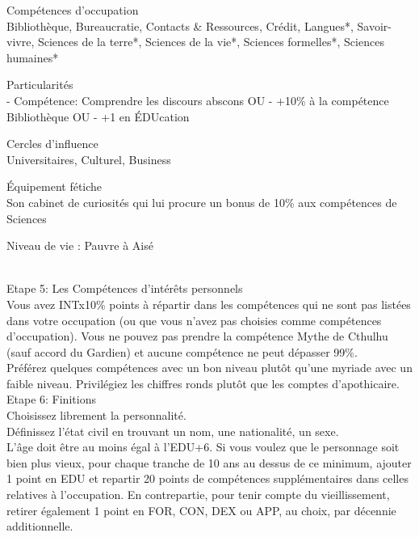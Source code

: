 \documentclass[11pt,twoside,a4paper]{article}
\begin{document}
\begin{multicols*}{2}
\begin{itemize}
	Comp{\'e}tences d'occupation~\\
	Biblioth{\`e}que, Bureaucratie, Contacts \& Ressources, Cr{\'e}dit, Langues*, Savoir-vivre, Sciences de la terre*, Sciences de la vie*, Sciences formelles*, Sciences humaines*
	
	Particularit{\'e}s~\\
	- Comp{\'e}tence: Comprendre les discours abscons OU
	- +10\% {\`a} la comp{\'e}tence Biblioth{\`e}que OU
	- +1 en {\'E}DUcation
	
	Cercles d'influence~\\
	Universitaires, Culturel, Business
	
	{\'E}quipement f{\'e}tiche~\\
	Son cabinet de curiosit{\'e}s qui lui procure un bonus de 10\% aux comp{\'e}tences de Sciences
	
	Niveau de vie : 
	Pauvre {\`a} Ais{\'e}

\end{itemize} ~\\ %

Etape 5: Les Comp{\'e}tences d'int{\'e}r{\^e}ts personnels~\\
	Vous avez INTx10\% points {\`a} r{\'e}partir dans les comp{\'e}tences qui ne sont pas list{\'e}es dans votre occupation (ou que vous n'avez pas choisies comme comp{\'e}tences d'occupation). Vous ne pouvez pas prendre la comp{\'e}tence Mythe de Cthulhu (sauf accord du Gardien) et aucune comp{\'e}tence ne peut d{\'e}passer 99\%. ~\\
	Pr{\'e}f{\'e}rez quelques comp{\'e}tences avec un bon niveau plut{\^o}t qu'une myriade avec un faible niveau. Privil{\'e}giez les chiffres ronds plut{\^o}t que les comptes d'apothicaire. ~\\

Etape 6: Finitions~\\
	Choisissez librement la personnalit{\'e}. ~\\
	
	D{\'e}finissez l'{\'e}tat civil en trouvant un nom, une nationalit{\'e}, un sexe. ~\\
	
	L'{\^a}ge doit {\^e}tre au moins {\'e}gal {\`a} l'EDU+6. Si vous voulez que le personnage soit bien plus vieux, pour chaque tranche de 10 ans au dessus de ce minimum, ajouter 1 point en EDU et repartir 20 points de comp{\'e}tences suppl{\'e}mentaires dans celles relatives {\`a} l'occupation. En contrepartie, pour tenir compte du vieillissement, retirer {\'e}galement 1 point en FOR, CON, DEX ou APP, au choix, par d{\'e}cennie additionnelle. ~\\
	

\end{multicols*}
\end{document}
